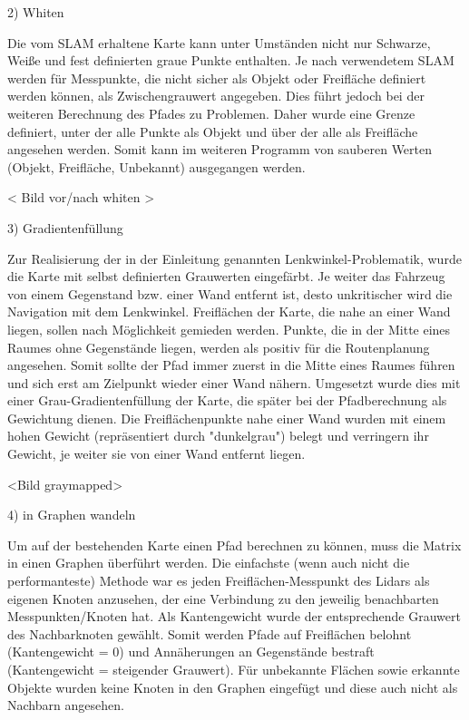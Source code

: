 2) Whiten

Die vom SLAM erhaltene Karte kann unter Umständen nicht nur Schwarze, Weiße und fest definierten graue Punkte enthalten. Je nach verwendetem SLAM werden für Messpunkte, die nicht sicher als Objekt oder Freifläche definiert werden können, als Zwischengrauwert angegeben. Dies führt jedoch bei der weiteren Berechnung des Pfades zu Problemen. Daher wurde eine Grenze definiert, unter der alle Punkte als Objekt und über der alle als Freifläche angesehen werden. Somit kann im weiteren Programm von sauberen Werten (Objekt, Freifläche, Unbekannt) ausgegangen werden. 

< Bild vor/nach whiten >


3) Gradientenfüllung

Zur Realisierung der in der Einleitung genannten Lenkwinkel-Problematik, wurde die Karte mit selbst definierten Grauwerten eingefärbt. Je weiter das Fahrzeug von einem Gegenstand bzw. einer Wand entfernt ist, desto unkritischer wird die Navigation mit dem Lenkwinkel. 
Freiflächen der Karte, die nahe an einer Wand liegen, sollen nach Möglichkeit gemieden werden. Punkte, die in der Mitte eines Raumes ohne Gegenstände liegen, werden als positiv für die Routenplanung angesehen. 
Somit sollte der Pfad immer zuerst in die Mitte eines Raumes führen und sich erst am Zielpunkt wieder einer Wand nähern. 
Umgesetzt wurde dies mit einer Grau-Gradientenfüllung der Karte, die später bei der Pfadberechnung als Gewichtung dienen. Die Freiflächenpunkte nahe einer Wand wurden mit einem hohen Gewicht (repräsentiert durch "dunkelgrau") belegt und verringern ihr Gewicht, je weiter sie von einer Wand entfernt liegen. 

<Bild graymapped>


4) in Graphen wandeln

Um auf der bestehenden Karte einen Pfad berechnen zu können, muss die Matrix in einen Graphen überführt werden. Die einfachste (wenn auch nicht die performanteste) Methode war es jeden Freiflächen-Messpunkt des Lidars als eigenen Knoten anzusehen, der eine Verbindung zu den jeweilig benachbarten Messpunkten/Knoten hat. Als Kantengewicht wurde der entsprechende Grauwert des Nachbarknoten gewählt. Somit werden Pfade auf Freiflächen belohnt (Kantengewicht = 0) und Annäherungen an Gegenstände bestraft (Kantengewicht = steigender Grauwert). 
Für unbekannte Flächen sowie erkannte Objekte wurden keine Knoten in den Graphen eingefügt und diese auch nicht als Nachbarn angesehen. 


